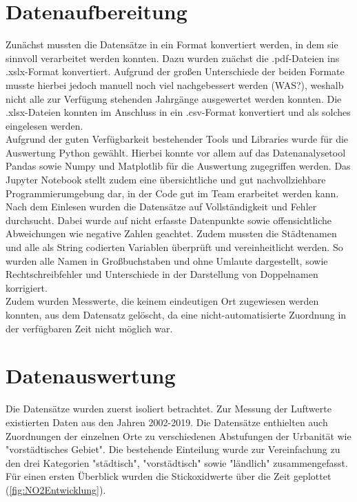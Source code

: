 \documentclass[11pt,a4paper,oneside,german]{article}
\begin{document}
\section{Datenaufbereitung}

Zunächst mussten die Datensätze in ein Format konvertiert werden, in dem sie sinnvoll verarbeitet werden konnten. Dazu wurden zuächst die .pdf-Dateien ins .xslx-Format konvertiert. Aufgrund der großen Unterschiede der beiden Formate musste hierbei jedoch manuell noch viel nachgebessert werden (WAS?), weshalb nicht alle zur Verfügung stehenden Jahrgänge ausgewertet werden konnten. Die .xlsx-Dateien konnten im Anschluss in ein .csv-Format konvertiert und als solches eingelesen werden.\\
Aufgrund der guten Verfügbarkeit bestehender Tools und Libraries wurde für die Auswertung Python gewählt. Hierbei konnte vor allem auf das Datenanalysetool Pandas sowie Numpy und Matplotlib für die Auswertung zugegriffen werden. Das Jupyter Notebook stellt zudem eine übersichtliche und gut nachvollziehbare Programmierumgebung dar, in der Code gut im Team erarbeitet werden kann.\\
Nach dem Einlesen wurden die Datensätze auf Vollständigkeit und Fehler durchsucht. Dabei wurde auf nicht erfasste Datenpunkte sowie offensichtliche Abweichungen wie negative Zahlen geachtet. Zudem mussten die Städtenamen und alle als String codierten Variablen überprüft und vereinheitlicht werden. So wurden alle Namen in Großbuchstaben und ohne Umlaute dargestellt, sowie Rechtschreibfehler und Unterschiede in der Darstellung von Doppelnamen korrigiert. \\
Zudem wurden Messwerte, die keinem eindeutigen Ort zugewiesen werden konnten, aus dem Datensatz gelöscht, da eine nicht-automatisierte Zuordnung in der verfügbaren Zeit nicht möglich war.

\section{Datenauswertung}

Die Datensätze wurden zuerst isoliert betrachtet. Zur Messung der Luftwerte existierten Daten aus den Jahren 2002-2019. Die  Datensätze enthielten auch Zuordnungen der einzelnen Orte zu verschiedenen Abstufungen der Urbanität wie "vorstädtisches Gebiet". Die bestehende Einteilung wurde zur Vereinfachung zu den drei Kategorien "städtisch", "vorstädtisch" sowie "ländlich" zusammengefasst. Für einen ersten Überblick wurden die Stickoxidwerte über die Zeit geplottet (\ref{fig:NO2Entwicklung}).
\end{document}
